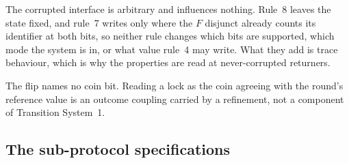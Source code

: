 {The corrupted interface is arbitrary and influences nothing.
Rule~8 leaves the state fixed, and rule~7 writes only where the $F$ disjunct
already counts its identifier at both bits, so neither rule changes which bits
are supported, which mode the system is in, or what value rule~4 may write.
What they add is trace behaviour, which is why the properties are read at
never-corrupted returners.

The flip names no coin bit.
Reading a lock as the coin agreeing with the round's reference value is an
outcome coupling carried by a refinement, not a component of Transition
System~1.
}



\subsection{The sub-protocol specifications}



